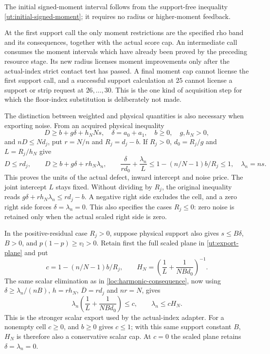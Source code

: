 The initial signed-moment interval follows from the support-free
inequality \eqref{ut:initial-signed-moment}; it requires no radius
or higher-moment feedback.

At the first support call the only moment restrictions are the
specified rho band and its consequences, together with the actual
score cap. An intermediate call consumes the moment intervals which
have already been proved by the preceding resource stage. Its new
radius licenses moment improvements only after the actual-index
strict contact test has passed. A final moment cap cannot license
the first support call, and a successful support calculation at $25$
cannot license a support or strip request at $26,\ldots,30$.
This is the one kind of acquisition step for which the floor-index
substitution is deliberately not made.

The distinction between weighted and physical quantities is also
necessary when exporting noise. From an acquired physical inequality
\[
 D\ge b+g\delta+h_NNs,\quad
 \delta=a_0+a_1,\quad b\ge0,\quad g,h_N>0,
\]
and $nD\le Nd_j$, put $r=N/n$ and $R_j=d_j-b$.
If $R_j>0$, $d_0=R_j/g$ and $L=R_j/h_N$ give
\begin{equation}\label{ut:export-plane}
 D\le rd_j,\qquad
 D\ge b+g\delta+rh_N\lambda_n,\qquad
 \frac{\delta}{rd_0}+\frac{\lambda_n}{L}
                 \le1-(n/N-1)b/R_j\le1,
 \quad\lambda_n=ns.
\end{equation}
This proves the units of the actual defect, inward intercept and noise
price. The joint intercept $L$ stays fixed. Without dividing by $R_j$,
the original inequality reads
$g\delta+rh_N\lambda_n\le rd_j-b$.
A negative right side excludes the cell, and a zero right side forces
$\delta=\lambda_n=0$. This also specifies the cases $R_j\le0$:
zero noise is retained only when the actual scaled right side is zero.

In the positive-residual case $R_j>0$, suppose physical support also gives $s\le B\delta$,
$B>0$, and $p(1-p)\ge v_l>0$. Retain first the full scaled
plane in \eqref{ut:export-plane} and put
\[
 c=1-(n/N-1)b/R_j,\qquad
 H_N=\left(\frac1L+\frac1{NBd_0}\right)^{-1}.
\]
The same scalar elimination as in \eqref{loc:harmonic-consequence},
now using $\delta\ge\lambda_n/(nB)$, $h=rh_N$,
$\overline D=rd_j$ and $nr=N$, gives
\begin{equation}\label{ut:scaled-harmonic}
 \lambda_n\left(\frac1L+\frac1{NBd_0}\right)\le c,
 \qquad \lambda_n\le cH_N.
\end{equation}
This is the stronger scalar export used by the actual-index adapter.
For a nonempty cell $c\ge0$, and $b\ge0$ gives $c\le1$;
with this same support constant $B$, $H_N$ is therefore also
a conservative scalar cap. At $c=0$ the scaled plane retains
$\delta=\lambda_n=0$.

